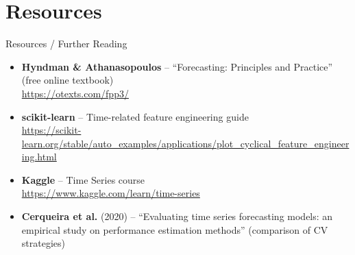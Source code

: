 \documentclass[11pt,compress,t,notes=noshow, xcolor=table]{beamer}
\begin{document}
\section{Resources}
\begin{vbframe}{Resources / Further Reading}
\vfill
\begin{itemize}
    \item \textbf{Hyndman \& Athanasopoulos} -- ``Forecasting: Principles and Practice'' (free online textbook)\\
    \url{https://otexts.com/fpp3/}
    \item \textbf{scikit-learn} -- Time-related feature engineering guide\\
    \url{https://scikit-learn.org/stable/auto_examples/applications/plot_cyclical_feature_engineering.html}
    \item \textbf{Kaggle} -- Time Series course\\
    \url{https://www.kaggle.com/learn/time-series}
    \item \textbf{Cerqueira et al.} (2020) -- ``Evaluating time series forecasting models: an empirical study on performance estimation methods'' (comparison of CV strategies)
\end{itemize}
\vfill
\end{vbframe}
\end{document}
